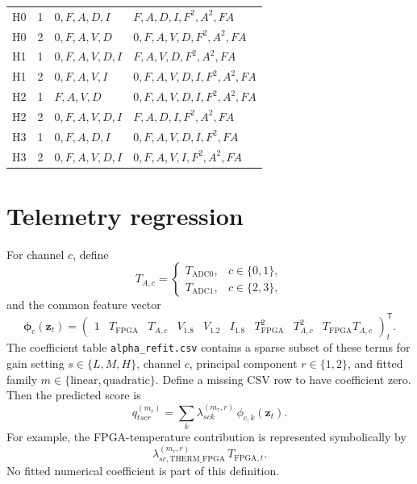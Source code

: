 \documentclass[11pt]{article}
\begin{document}
\begin{longtable}{@{}llp{}p{}@{}}
H0 & 1 & $0,F,A,D,I$ & $F,A,D,I,F^2,A^2,FA$ \\
H0 & 2 & $0,F,A,V,D$ & $0,F,A,V,D,F^2,A^2,FA$ \\
H1 & 1 & $0,F,A,V,D,I$ & $F,A,V,D,F^2,A^2,FA$ \\
H1 & 2 & $0,F,A,V,I$ & $0,F,A,V,D,I,F^2,A^2,FA$ \\
H2 & 1 & $F,A,V,D$ & $0,F,A,V,D,I,F^2,A^2,FA$ \\
H2 & 2 & $0,F,A,V,D,I$ & $F,A,D,I,F^2,A^2,FA$ \\
H3 & 1 & $0,F,A,D,I$ & $0,F,A,V,D,I,F^2,FA$ \\
H3 & 2 & $0,F,A,V,D,I$ & $0,F,A,V,I,F^2,A^2,FA$ \\
\bottomrule
\end{longtable}

\section{Telemetry regression}

For channel $c$, define
\begin{equation}
  T_{A,c} =
  \begin{cases}
    T_{\mathrm{ADC0}}, & c\in\{0,1\},\\
    T_{\mathrm{ADC1}}, & c\in\{2,3\},
  \end{cases}
\end{equation}
and the common feature vector
\begin{equation}
  \boldsymbol{\phi}_c(\mathbf z_t) =
  \begin{pmatrix}
    1 & T_{\mathrm{FPGA}} & T_{A,c} & V_{1.8} & V_{1.2} & I_{1.8}
      & T_{\mathrm{FPGA}}^2 & T_{A,c}^2
      & T_{\mathrm{FPGA}}T_{A,c}
  \end{pmatrix}^{\!\mathsf T}_{t}.
  \label{eq:features}
\end{equation}
The coefficient table \texttt{alpha\_refit.csv} contains a sparse subset
of these terms for gain setting $s\in\{L,M,H\}$, channel $c$, principal
component $r\in\{1,2\}$, and fitted family
$m\in\{\mathrm{linear},\mathrm{quadratic}\}$.  Define a missing CSV row to
have coefficient zero.  Then the predicted score is
\begin{equation}
  q^{(m_r)}_{tscr}
  = \sum_k \lambda^{(m_r,r)}_{sck}\,
      \phi_{c,k}(\mathbf z_t).
  \label{eq:pc-score}
\end{equation}
For example, the FPGA-temperature contribution is represented symbolically by
\begin{equation*}
  \lambda^{(m_r,r)}_{sc,\mathrm{THERM\_FPGA}}\,
  T_{\mathrm{FPGA},t}.
\end{equation*}
No fitted numerical coefficient is part of this definition.
\end{document}
